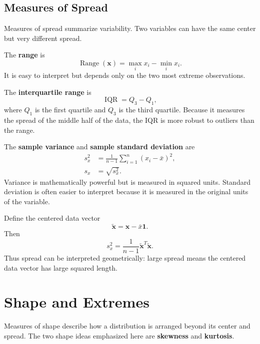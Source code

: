 {\subsection{Measures of Spread}

Measures of spread summarize variability.  Two variables can have the same center but very different spread.

The \textbf{range} is
\begin{equation}
  \operatorname{Range}(\mathbf{x})=\max_i x_i-\min_i x_i.
\end{equation}
It is easy to interpret but depends only on the two most extreme observations.

The \textbf{interquartile range} is
\begin{equation}
  \operatorname{IQR}=Q_3-Q_1,
\end{equation}
where $Q_1$ is the first quartile and $Q_3$ is the third quartile.  Because it measures the spread of the middle half of the data, the IQR is more robust to outliers than the range.

The \textbf{sample variance} and \textbf{sample standard deviation} are
\begin{align}
  s_x^2 &= \frac{1}{n-1}\sum_{i=1}^n (x_i-\bar{x})^2,
  \label{eq:ch4-sample-variance}\\
  s_x &= \sqrt{s_x^2}.
  \label{eq:ch4-sample-sd}
\end{align}
Variance is mathematically powerful but is measured in squared units.  Standard deviation is often easier to interpret because it is measured in the original units of the variable.

Define the centered data vector
\begin{equation}
  \widetilde{\mathbf{x}}=\mathbf{x}-\bar{x}\mathbf{1}.
\end{equation}
Then
\begin{equation}
  s_x^2=\frac{1}{n-1}\widetilde{\mathbf{x}}^T\widetilde{\mathbf{x}}.
  \label{eq:ch4-variance-vector-form}
\end{equation}
Thus spread can be interpreted geometrically: large spread means the centered data vector has large squared length.

\section{Shape and Extremes}

Measures of shape describe how a distribution is arranged beyond its center and spread.  The two shape ideas emphasized here are \textbf{skewness} and \textbf{kurtosis}.

}
